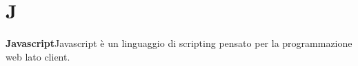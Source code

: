 \newpage
\section{J}\label{l:J}
\textbf{Javascript}\newline Javascript è un linguaggio di scripting pensato per la programmazione web lato client.
